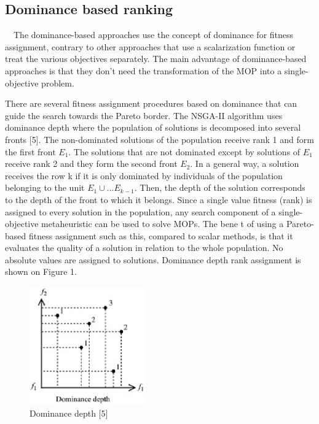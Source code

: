 \subsection[Dominance based ranking]{\label{identificadorReferenciaCruzada}
Dominance based ranking}

\ \ The dominance-based approaches use the concept of dominance for fitness assignment, contrary to other approaches that use a scalarization function or treat the various objectives separately. The main advantage of dominance-based approaches is that they don't need the transformation of the MOP into a single-objective problem.

There are several fitness assignment procedures based on dominance that can guide the search towards the Pareto border. The NSGA-II algorithm uses dominance depth where the population of solutions is decomposed into several fronts [5]. The non-dominated solutions of the population receive rank 1 and form the first front $E_{1}$. The solutions that are not dominated except by solutions of $E_{1}$ receive rank 2 and they form the second front $E_{2}$. In a general way, a solution receives
the row k if it is only dominated by individuals of the population belonging to the unit $E_{1} \cup ... E_{k-1}$. Then, the depth of the solution corresponds to the depth of the front to which it belongs. Since a single value fitness (rank) is assigned to every solution in the population, any search component of a single- objective metaheuristic can be used to solve MOPs. The bene t of using a Pareto- based fitness assignment such as this, compared to scalar methods, is that it evaluates the quality of a solution in relation to the whole population. No absolute values are assigned to solutions. Dominance depth rank assignment is shown on Figure 1.
\begin{figure}[h!]
\begin{center}
\includegraphics[width = 5cm] {./Graphics/Figure1.eps} 

\caption{Dominance depth [5]}
\end{center}
\end{figure}
